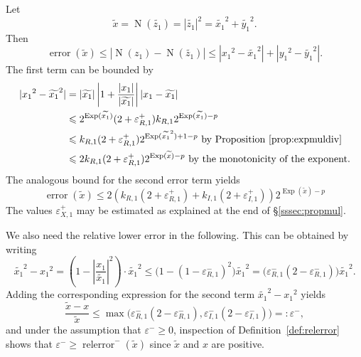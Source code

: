 \documentclass [11pt]{article}
\newcommand {\corr}[1]{{#1}}
\newcommand {\appro}[1]{\widetilde {#1}}
\DeclareMathOperator{\Exp}{\operatorname {Exp}}
\newcommand{\error}{\operatorname {error}}
\newcommand{\relerror}{\operatorname {relerror}}
\newcommand{\Norm}{\operatorname {N}}
\renewcommand {\epsilon}{\varepsilon}
\renewcommand {\leq}{\leqslant}
\renewcommand {\geq}{\geqslant}
\begin{document}
Let
\[
\appro x = \Norm (\appro {z_1}) = |\appro {z_1}|^2
= \appro {x_1}^2 + \appro {y_1}^2.
\]
Then
\[
\error (\appro x) \leq
| \Norm (\corr {z_1}) - \Norm (\appro {z_1}) |
\leq | \corr {x_1}^2 - \appro {x_1}^2 | + | \corr {y_1}^2 - \appro {y_1}^2 |.
\]
The first term can be bounded by
\begin {align*}
| \corr {x_1}^2 - \appro {x_1}^2 |
& = |\appro {x_1}| \left| 1 + \frac {|\corr {x_1}|}{|\appro {x_1}|} \right|
    |\corr {x_1} - \appro {x_1}| \\
& \leq 2^{\Exp (\appro {x_1})} (2 + \epsilon_{R, 1}^+) k_{R, 1}
2^{\Exp (\appro {x_1}) - p} \\
& \leq k_{R, 1} (2 + \epsilon_{R, 1}^+) 2^{\Exp (\appro {x_1}^2) + 1 - p}
\text { by Proposition~\ref {prop:expmuldiv}} \\
& \leq 2 k_{R, 1} (2 + \epsilon_{R, 1}^+) 2^{\Exp (\appro x) - p}
\text { by the monotonicity of the exponent.}
\end {align*}
The analogous bound for the second error term yields
\begin {equation}
\label {eq:propnorm}
\error (\appro x) \leq
  2 \left(
       k_{R, 1} (2 + \epsilon_{R, 1}^+)
     + k_{I, 1} (2 + \epsilon_{I, 1}^+)
\right)
2^{\Exp (\appro x) - p}
\end {equation}
The values $\epsilon_{X, 1}^+$ may be estimated as explained at the end
of \S\ref {sssec:propmul}.

We also need the relative lower error in the following. This can be obtained
by writing
\[
\appro {x_1}^2 - \corr {x_1}^2
=
\left( 1 - \left| \frac {\corr {x_1}}{\appro {x_1}} \right|^2 \right)
\cdot \appro {x_1}^2
\leq
\big( 1 - (1 - \epsilon_{R, 1}^-)^2 \big) \appro {x_1}^2
=
\big( \epsilon_{R, 1}^- (2 - \epsilon_{R, 1}^-) \big) \appro {x_1}^2.
\]
Adding the corresponding expression for the second term
$\appro {x_1}^2 - \corr {x_1}^2$ yields
\begin {equation}
\label {eq:propnormepsminus}
\frac {\appro x - \corr x}{\appro x}
\leq
\max \big(
   \epsilon_{R, 1}^- (2 - \epsilon_{R, 1}^-),
   \epsilon_{I, 1}^- (2 - \epsilon_{I, 1}^-)
\big)
=: \epsilon^-,
\end {equation}
and under the assumption that $\epsilon^- \geq 0$, inspection of
Definition~\ref {def:relerror} shows that
$\epsilon^- \geq \relerror^- (\appro x)$ since
$\appro x$ and $\corr x$ are positive.
\end{document}
